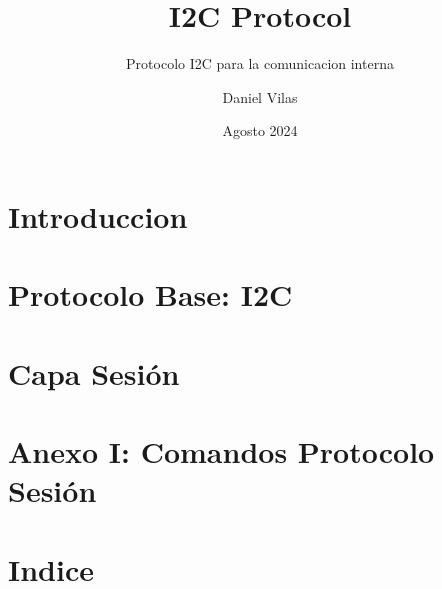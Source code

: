 \documentclass[spanish]{DccDiyTools/DccDiyTools}
\title{I2C Protocol}
\subtitle{Protocolo I2C para la comunicacion interna}
\author{Daniel Vilas}
\date{Agosto 2024}
\begin{document}
\maketitle{}
\newpage{}
\section{Introduccion}


\newpage{}
\section{Protocolo Base: I2C}


\newpage{}
\section{Capa Sesión}



\newpage{}
\section{Anexo I: Comandos Protocolo Sesión}



\newpage{}
\section{Indice}
\tableofcontents{}

\listoffigures{}
\listoftables{}
\end{document}
